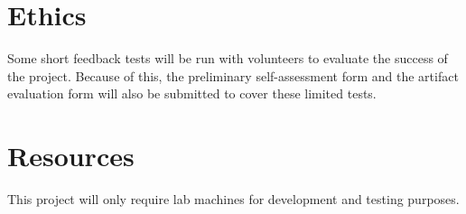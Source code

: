 \documentclass[12pt]{extarticle}
\begin{document}
\section*{Ethics}

Some short feedback tests will be run with volunteers to evaluate the success of the project. Because of this, the preliminary self-assessment form and the artifact evaluation form will also be submitted to cover these limited tests.

\section*{Resources}

This project will only require lab machines for development and testing purposes.
\end{document}
